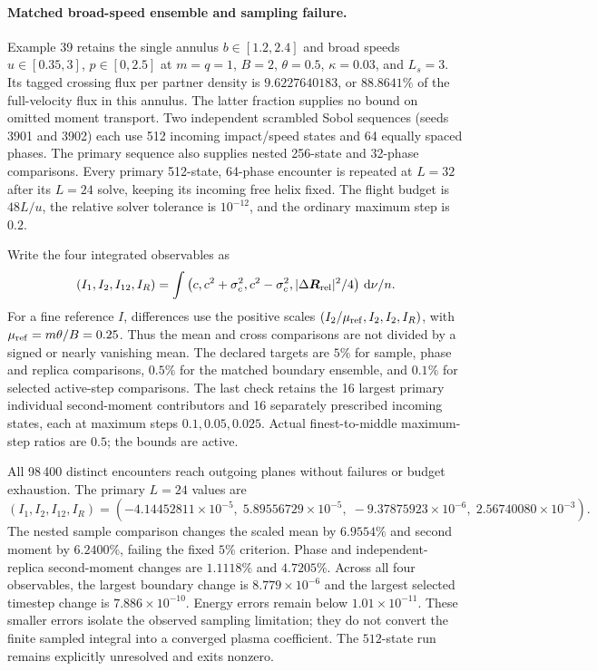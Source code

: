 \documentclass[11pt,letterpaper]{article}
\newcommand{\dd}{\mathrm d}
\begin{document}
\paragraph{Matched broad-speed ensemble and sampling failure.}
Example 39 retains the single annulus $b\in[1.2,2.4]$ and broad speeds
$u\in[0.35,3]$, $p\in[0,2.5]$ at $m=q=1$, $B=2$, $\theta=0.5$,
$\kappa=0.03$, and $L_s=3$. Its tagged crossing flux per partner density is
$9.6227640183$, or $88.8641\%$ of the full-velocity flux in this annulus.
The latter fraction supplies no bound on omitted moment transport.
Two independent scrambled Sobol sequences (seeds 3901 and 3902) each use
512 incoming impact/speed states and 64 equally spaced phases. The primary
sequence also supplies nested 256-state and 32-phase comparisons. Every
primary 512-state, 64-phase encounter is repeated at $L=32$ after its
$L=24$ solve, keeping its incoming free helix fixed. The flight budget is
$48L/u$, the relative solver tolerance is $10^{-12}$, and the ordinary
maximum step is $0.2$.

Write the four integrated observables as
\[
 (I_1,I_2,I_{12},I_R)
 =\int\left(c,c^2+\sigma_c^2,c^2-\sigma_c^2,
             |\Delta\bm R_{\rm rel}|^2/4\right)\,\dd\nu/n.
\]
For a fine reference $I$, differences use the positive scales
$(I_2/\mu_{\rm ref},I_2,I_2,I_R)$, with
$\mu_{\rm ref}=m\theta/B=0.25$. Thus the mean and cross comparisons are
not divided by a signed or nearly vanishing mean. The declared targets are
$5\%$ for sample, phase and replica comparisons, $0.5\%$ for the matched
boundary ensemble, and $0.1\%$ for selected active-step comparisons.
The last check retains the 16 largest primary individual second-moment
contributors and 16 separately prescribed incoming states, each at maximum
steps $0.1,0.05,0.025$. Actual finest-to-middle maximum-step ratios are
$0.5$; the bounds are active.

All 98\,400 distinct encounters reach outgoing planes without failures or
budget exhaustion. The primary $L=24$ values are
\[
 (I_1,I_2,I_{12},I_R)=
 (-4.14452811\times10^{-5},\;5.89556729\times10^{-5},\;
 -9.37875923\times10^{-6},\;2.56740080\times10^{-3}).
\]
The nested sample comparison changes the scaled mean by $6.9554\%$ and
second moment by $6.2400\%$, failing the fixed $5\%$ criterion. Phase
and independent-replica second-moment changes are $1.1118\%$ and $4.7205\%$.
Across all four observables, the largest boundary change is
$8.779\times10^{-6}$ and the largest selected timestep change is
$7.886\times10^{-10}$. Energy errors remain below $1.01\times10^{-11}$.
These smaller errors isolate the observed sampling limitation; they do not
convert the finite sampled integral into a converged plasma coefficient.
The $512$-state run remains explicitly unresolved and exits nonzero.
\end{document}
